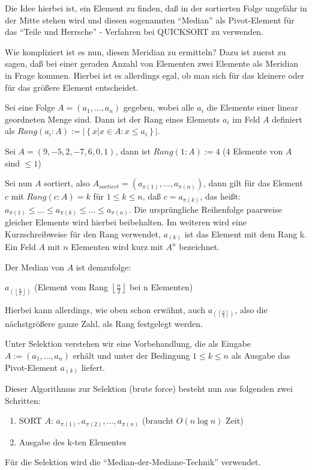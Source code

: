  Die Idee hierbei ist, ein Element zu finden, daß in der sortierten Folge ungefähr in der Mitte stehen wird und diesen sogenannten
 "`Median"' als Pivot-Element für das "`Teile und Herrsche"' - Verfahren bei \textsc{QUICKSORT} zu verwenden.

 Wie kompliziert ist es nun, diesen Meridian zu ermitteln? Dazu ist zuerst zu sagen, daß bei einer geraden Anzahl von Elementen zwei
 Elemente als Meridian in Frage kommen. Hierbei ist es allerdings egal, ob man sich für das kleinere oder für das größere Element
 entscheidet.

\begin{definition}
 Sei eine Folge $A=(a_{1}, \ldots , a_{n})$ gegeben, wobei alle $a_{i}$ die Elemente einer linear geordneten Menge sind. 
 Dann ist der Rang eines Elements $a_i$ im Feld $A$ definiert als $Rang(a_{i}:A):=\left|\left\{x|x \in A:x\leq a_{i}\right\}\right|$.
\end{definition}

 Sei $A=(9,-5,2,-7,6,0,1)$, dann ist $Rang(1:A):=4$ (4 Elemente von $A$ sind $\leq 1$)
\bigskip

Sei nun $A$ sortiert, also $A_{sortiert}=(a_{\pi(1)}, \ldots , a_{\pi(n)})$, dann gilt für das Element $c$ mit $Rang(c:A)=k$ für $1\leq k
\leq n$, daß $c=a_{\pi(k)}$, das heißt:
$a_{\pi(1)}\leq \ldots \leq a_{\pi(k)}\leq \ldots \leq a_{\pi(n)}$.
Die ursprüngliche Reihenfolge paarweise gleicher Elemente wird hierbei beibehalten. Im weiteren wird
eine Kurzschreibweise für den Rang verwendet, $a_{(k)}$ ist das Element mit dem Rang k. Ein Feld $A$ mit $n$ Elementen wird kurz mit $A^n$
bezeichnet.

\begin{definition}
Der Median von $A$ ist demzufolge:

$a_{\left(\left\lfloor \frac{n}{2}\right\rfloor\right)}$ (Element vom Rang $\left\lfloor \frac{n}{2}\right\rfloor$ bei n Elementen)
\end{definition}

Hierbei kann allerdings, wie oben schon erwähnt, auch $a_{\left(\left\lceil \frac{n}{2}\right\rceil\right)}$, also die nächstgrößere
ganze Zahl, als Rang festgelegt werden.

Unter Selektion verstehen wir eine Vorbehandlung, die als Eingabe 
$A:=(a_{1}, \ldots , a_{n})$ erhält und unter der Bedingung $1\leq k\leq n$ als Ausgabe das Pivot-Element $a_{(k)}$ liefert.

 Dieser Algorithmus zur Selektion (brute force) besteht nun aus folgenden zwei Schritten:
 \begin{enumerate}
	\item SORT $A$: $a_{\pi(1)}, a_{\pi(2)}, \ldots , a_{\pi(n)}$ (braucht $O(n \log n)$ Zeit)
	\item Ausgabe des k-ten Elementes
 \end{enumerate}
 Für die Selektion wird die "`Median-der-Mediane-Technik"' verwendet. 

